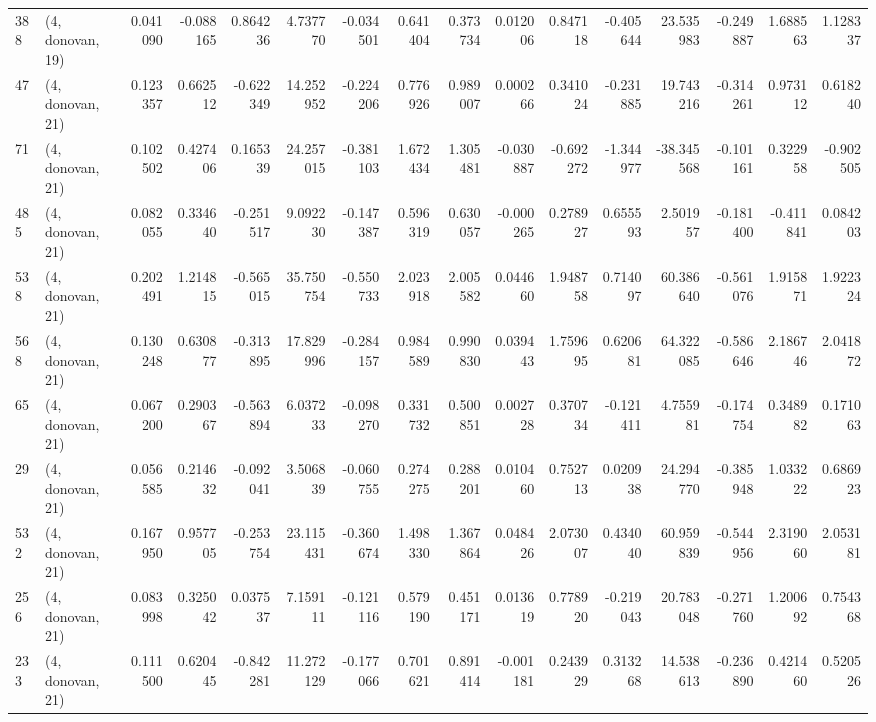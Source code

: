 \begin{tabular}{llrrrrrrrrrrrrrr}
388 &  (4, donovan, 19) &   0.041090 & -0.088165 &  0.864236 &    4.737770 & -0.034501 &   0.641404 &  0.373734 &  0.012006 &  0.847118 & -0.405644 &   23.535983 & -0.249887 &  1.688563 &  1.128337 \\
47  &  (4, donovan, 21) &   0.123357 &  0.662512 & -0.622349 &   14.252952 & -0.224206 &   0.776926 &  0.989007 &  0.000266 &  0.341024 & -0.231885 &   19.743216 & -0.314261 &  0.973112 &  0.618240 \\
71  &  (4, donovan, 21) &   0.102502 &  0.427406 &  0.165339 &   24.257015 & -0.381103 &   1.672434 &  1.305481 & -0.030887 & -0.692272 & -1.344977 &  -38.345568 & -0.101161 &  0.322958 & -0.902505 \\
485 &  (4, donovan, 21) &   0.082055 &  0.334640 & -0.251517 &    9.092230 & -0.147387 &   0.596319 &  0.630057 & -0.000265 &  0.278927 &  0.655593 &    2.501957 & -0.181400 & -0.411841 &  0.084203 \\
538 &  (4, donovan, 21) &   0.202491 &  1.214815 & -0.565015 &   35.750754 & -0.550733 &   2.023918 &  2.005582 &  0.044660 &  1.948758 &  0.714097 &   60.386640 & -0.561076 &  1.915871 &  1.922324 \\
568 &  (4, donovan, 21) &   0.130248 &  0.630877 & -0.313895 &   17.829996 & -0.284157 &   0.984589 &  0.990830 &  0.039443 &  1.759695 &  0.620681 &   64.322085 & -0.586646 &  2.186746 &  2.041872 \\
65  &  (4, donovan, 21) &   0.067200 &  0.290367 & -0.563894 &    6.037233 & -0.098270 &   0.331732 &  0.500851 &  0.002728 &  0.370734 & -0.121411 &    4.755981 & -0.174754 &  0.348982 &  0.171063 \\
29  &  (4, donovan, 21) &   0.056585 &  0.214632 & -0.092041 &    3.506839 & -0.060755 &   0.274275 &  0.288201 &  0.010460 &  0.752713 &  0.020938 &   24.294770 & -0.385948 &  1.033222 &  0.686923 \\
532 &  (4, donovan, 21) &   0.167950 &  0.957705 & -0.253754 &   23.115431 & -0.360674 &   1.498330 &  1.367864 &  0.048426 &  2.073007 &  0.434040 &   60.959839 & -0.544956 &  2.319060 &  2.053181 \\
256 &  (4, donovan, 21) &   0.083998 &  0.325042 &  0.037537 &    7.159111 & -0.121116 &   0.579190 &  0.451171 &  0.013619 &  0.778920 & -0.219043 &   20.783048 & -0.271760 &  1.200692 &  0.754368 \\
233 &  (4, donovan, 21) &   0.111500 &  0.620445 & -0.842281 &   11.272129 & -0.177066 &   0.701621 &  0.891414 & -0.001181 &  0.243929 &  0.313268 &   14.538613 & -0.236890 &  0.421460 &  0.520526 \\

\end{tabular}
